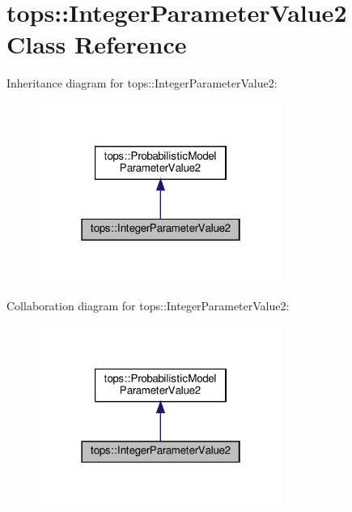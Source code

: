 \hypertarget{classtops_1_1IntegerParameterValue2}{}\section{tops\+:\+:Integer\+Parameter\+Value2 Class Reference}
\label{classtops_1_1IntegerParameterValue2}


Inheritance diagram for tops\+:\+:Integer\+Parameter\+Value2\+:
\nopagebreak
\begin{figure}[H]
\begin{center}
\leavevmode
\includegraphics[width=226pt]{classtops_1_1IntegerParameterValue2__inherit__graph}
\end{center}
\end{figure}


Collaboration diagram for tops\+:\+:Integer\+Parameter\+Value2\+:
\nopagebreak
\begin{figure}[H]
\begin{center}
\leavevmode
\includegraphics[width=226pt]{classtops_1_1IntegerParameterValue2__coll__graph}
\end{center}
\end{figure}
